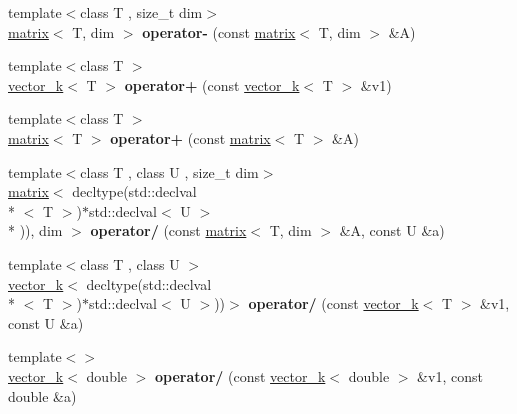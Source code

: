 \begin{DoxyCompactItemize}
\item 
\hypertarget{namespacekeycpp_ac6b0a62473683f833921698fbf6f5ed2}{{\footnotesize template$<$class T , size\-\_\-t dim$>$ }\\\hyperlink{classkeycpp_1_1matrix}{matrix}$<$ T, dim $>$ {\bfseries operator-\/} (const \hyperlink{classkeycpp_1_1matrix}{matrix}$<$ T, dim $>$ \&A)}\label{namespacekeycpp_ac6b0a62473683f833921698fbf6f5ed2}

\item 
\hypertarget{namespacekeycpp_a5daa1c95786fd3745687914963e7229e}{{\footnotesize template$<$class T $>$ }\\\hyperlink{classkeycpp_1_1vector__k}{vector\-\_\-k}$<$ T $>$ {\bfseries operator+} (const \hyperlink{classkeycpp_1_1vector__k}{vector\-\_\-k}$<$ T $>$ \&v1)}\label{namespacekeycpp_a5daa1c95786fd3745687914963e7229e}

\item 
\hypertarget{namespacekeycpp_a5b10f703c72875b9f5e2ecc5c7696f9c}{{\footnotesize template$<$class T $>$ }\\\hyperlink{classkeycpp_1_1matrix}{matrix}$<$ T $>$ {\bfseries operator+} (const \hyperlink{classkeycpp_1_1matrix}{matrix}$<$ T $>$ \&A)}\label{namespacekeycpp_a5b10f703c72875b9f5e2ecc5c7696f9c}

\item 
\hypertarget{namespacekeycpp_a4bb5672c8d698032875766c42cd52547}{{\footnotesize template$<$class T , class U , size\-\_\-t dim$>$ }\\\hyperlink{classkeycpp_1_1matrix}{matrix}$<$ decltype(std\-::declval\\*
$<$ T $>$)$\ast$std\-::declval$<$ U $>$\\*
)), dim $>$ {\bfseries operator/} (const \hyperlink{classkeycpp_1_1matrix}{matrix}$<$ T, dim $>$ \&A, const U \&a)}\label{namespacekeycpp_a4bb5672c8d698032875766c42cd52547}

\item 
\hypertarget{namespacekeycpp_afce3d5f6cf95bb68e12f3f80ff146ed8}{{\footnotesize template$<$class T , class U $>$ }\\\hyperlink{classkeycpp_1_1vector__k}{vector\-\_\-k}$<$ decltype(std\-::declval\\*
$<$ T $>$)$\ast$std\-::declval$<$ U $>$))$>$ {\bfseries operator/} (const \hyperlink{classkeycpp_1_1vector__k}{vector\-\_\-k}$<$ T $>$ \&v1, const U \&a)}\label{namespacekeycpp_afce3d5f6cf95bb68e12f3f80ff146ed8}

\item 
\hypertarget{namespacekeycpp_acf439f423c568a970ddc8cde5940a0e8}{{\footnotesize template$<$$>$ }\\\hyperlink{classkeycpp_1_1vector__k}{vector\-\_\-k}$<$ double $>$ {\bfseries operator/} (const \hyperlink{classkeycpp_1_1vector__k}{vector\-\_\-k}$<$ double $>$ \&v1, const double \&a)}\label{namespacekeycpp_acf439f423c568a970ddc8cde5940a0e8}


\end{DoxyCompactItemize}
